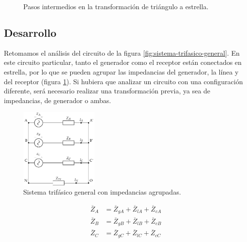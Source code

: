 \begin{figure}[H]
  \caption{Pasos intermedios en la transformación de triángulo a estrella.}
\end{figure}



\subsection{Desarrollo}

Retomamos el análisis del circuito de la figura \ref{fig:sistema-trifasico-general}. En este circuito particular, tanto el generador como el receptor están conectados en estrella, por lo que se pueden agrupar las impedancias del generador, la línea y del receptor (figura \ref{fig:sistema-trifasico-general2}). Si hubiera que analizar un circuito con una configuración diferente, será necesario realizar una transformación previa, ya sea de impedancias, de generador o ambas.

\begin{figure}[H]
  \centering
  \includegraphics[height=4cm]{../figs/CircuitoTrifasicaGeneralizado2.pdf}
  \caption{Sistema trifásico general con impedancias agrupadas.}
  \label{fig:sistema-trifasico-general2}
\end{figure}

\begin{align*}
  \overline{Z}_A &= \overline{Z}_{gA} + \overline{Z}_{lA} + \overline{Z}_{cA}\\
  \overline{Z}_B &= \overline{Z}_{gB} + \overline{Z}_{lB} + \overline{Z}_{cB}\\
  \overline{Z}_C &= \overline{Z}_{gC} + \overline{Z}_{lC} + \overline{Z}_{cC}
\end{align*}

